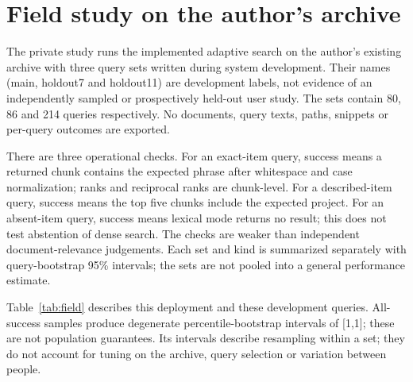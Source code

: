 \section{Field study on the author's archive}\label{sec:field}

The private study runs the implemented adaptive search on the author's existing archive with three query sets written during system development. Their names (main, holdout7 and holdout11) are development labels, not evidence of an independently sampled or prospectively held-out user study. The sets contain 80, 86 and 214 queries respectively. No documents, query texts, paths, snippets or per-query outcomes are exported.

There are three operational checks. For an exact-item query, success means a returned chunk contains the expected phrase after whitespace and case normalization; ranks and reciprocal ranks are chunk-level. For a described-item query, success means the top five chunks include the expected project. For an absent-item query, success means lexical mode returns no result; this does not test abstention of dense search. The checks are weaker than independent document-relevance judgements. Each set and kind is summarized separately with query-bootstrap 95\% intervals; the sets are not pooled into a general performance estimate.

\ifpaperfield
\begin{table}[!htbp]
\centering
\caption{Operational checks on the private archive: counts, means and 95\% query-bootstrap intervals. Exact-item metrics use chunk ranks; described-item success checks the project; absent-item success checks lexical abstention. Only aggregates are exported.}
\label{tab:field}

\end{table}
Table~\ref{tab:field} describes this deployment and these development queries. All-success samples produce degenerate percentile-bootstrap intervals of [1,1]; these are not population guarantees. Its intervals describe resampling within a set; they do not account for tuning on the archive, query selection or variation between people.
\else
{}
\fi
